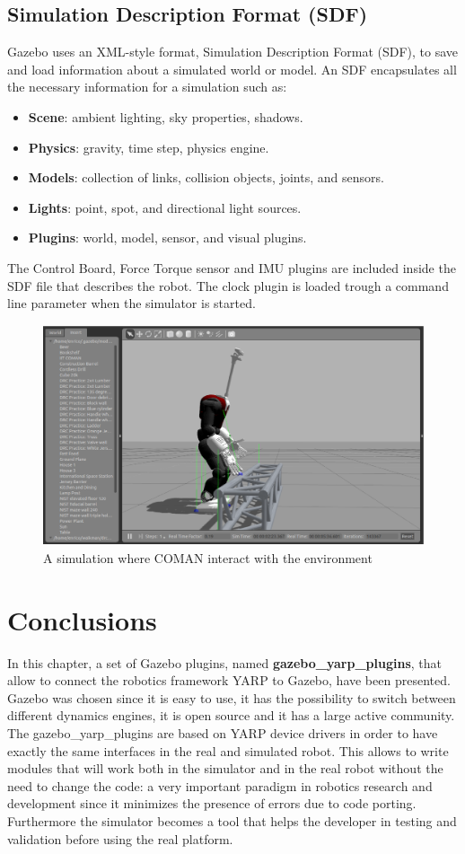 \subsection{Simulation Description Format (SDF)}
Gazebo uses an XML-style format, Simulation Description Format (SDF), to save and load information about a simulated world or model. An SDF encapsulates all the necessary information for a simulation such as:
\begin{itemize}
\item \textbf{Scene}: ambient lighting, sky properties, shadows.
\item \textbf{Physics}: gravity, time step, physics engine.
\item \textbf{Models}: collection of links, collision objects, joints, and sensors.
\item \textbf{Lights}: point, spot, and directional light sources.
\item \textbf{Plugins}: world, model, sensor, and visual plugins.
\end{itemize}
The Control Board, Force Torque sensor and IMU plugins are included inside the SDF file that describes the robot. The clock plugin is loaded trough a command line parameter when the simulator is started.
\begin{figure}
  \centering
    \includegraphics[height=6.5cm]{gfx/coman_ft_a.eps}
    \caption{A simulation where COMAN interact with the environment}\label{coman_ft}
\end{figure}


\section{Conclusions}
\label{sec:robotics-simulation:conclusions}
In this chapter, a set of Gazebo plugins, named \textbf{gazebo\_yarp\_plugins}, that allow to connect the robotics framework YARP to Gazebo, have been presented. Gazebo was chosen since it is easy to use, it has the possibility to switch between different dynamics engines, it is open source and it has a large active community. The gazebo\_yarp\_plugins are based on YARP device drivers in order to have exactly the same interfaces in the real and simulated robot. This allows to write modules that will work both in the simulator and in the real robot without the need to change the code: a very important paradigm in robotics research and development since it minimizes the presence of errors due to code porting. Furthermore the simulator becomes a tool that helps the developer in testing and validation before using the real platform.


